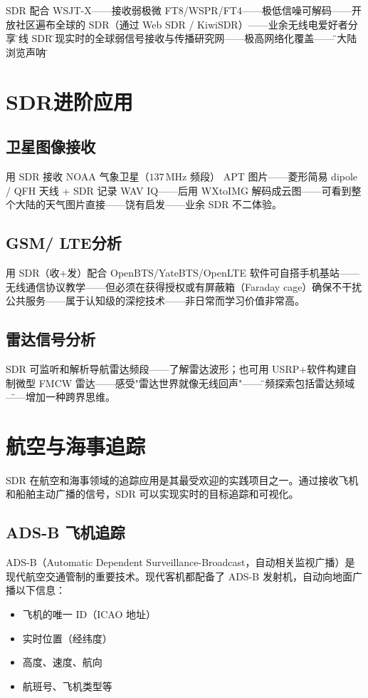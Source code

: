 \documentclass[12pt,UTF8]{ctexbook}
\begin{document}
SDR 配合 WSJT-X——接收弱极微 FT8/WSPR/FT4——极低信噪可解码——开放社区遍布全球的 SDR（通过 Web SDR / KiwiSDR）——业余无线电爱好者分享\"在线 SDR\"实现实时的全球弱信号接收与传播研究网——极高网络化覆盖——\"跨大陆浏览声呐\"。

\section{SDR进阶应用}
\label{sec:sdr_advanced}

\subsection{卫星图像接收}

用 SDR 接收 NOAA 气象卫星（$137\,\mathrm{MHz}$ 频段） APT 图片——菱形简易 dipole / QFH 天线 + SDR 记录 WAV IQ——后用 WXtoIMG 解码成云图——可看到整个大陆的天气图片直接——饶有启发——业余 SDR 不二体验。

\subsection{GSM/ LTE分析}

用 SDR（收+发）配合 OpenBTS/YateBTS/OpenLTE 软件可自搭手机基站——无线通信协议教学——但必须在获得授权或有屏蔽箱（Faraday cage）确保不干扰公共服务——属于认知级的深挖技术——非日常而学习价值非常高。

\subsection{雷达信号分析}

SDR 可监听和解析导航雷达频段——了解雷达波形；也可用 USRP+软件构建自制微型 FMCW 雷达——感受"雷达世界就像无线回声"——\"射频探索包括雷达频域\"——增加一种跨界思维。

\section{航空与海事追踪}
\label{sec:sdr_tracking}

SDR 在航空和海事领域的追踪应用是其最受欢迎的实践项目之一。通过接收飞机和船舶主动广播的信号，SDR 可以实现实时的目标追踪和可视化。

\subsection{ADS-B 飞机追踪}
\label{subsec:adsb}

ADS-B（Automatic Dependent Surveillance-Broadcast，自动相关监视广播）是现代航空交通管制的重要技术。现代客机都配备了 ADS-B 发射机，自动向地面广播以下信息：
\begin{itemize}[leftmargin=2cm]
    \item 飞机的唯一 ID（ICAO 地址）
    \item 实时位置（经纬度）
    \item 高度、速度、航向
    \item 航班号、飞机类型等
\end{itemize}
\end{document}
